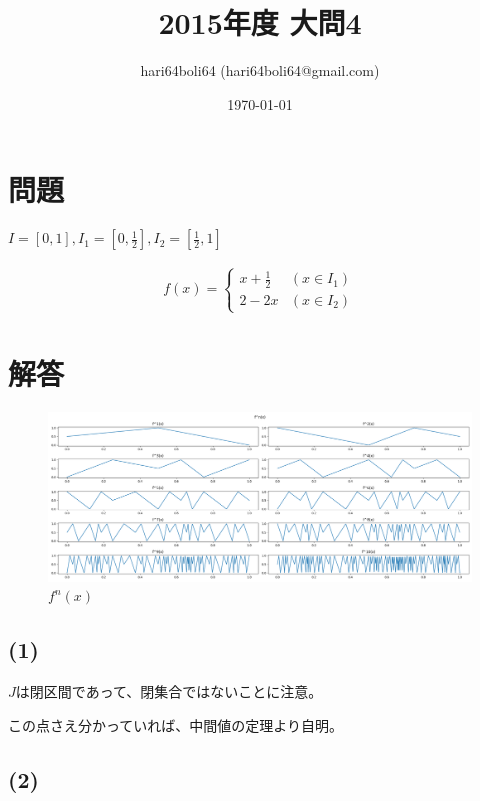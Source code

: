 \documentclass[a4paper, 10pt, dvipdfmx]{jlreq}
\begin{document}
\title{2015年度 大問4}
\author{hari64boli64 (hari64boli64@gmail.com)}
\date{\today}
\maketitle

\section{問題}

$I=[0,1],I_1=[0,\frac{1}{2}],I_2=[\frac{1}{2},1]$

\begin{align*}
  f(x)=\begin{cases}
         x+\frac{1}{2} & (x\in I_1)  \\
         2-2x          & (x \in I_2)
       \end{cases}
\end{align*}

\section{解答}

\begin{figure}[htbp]
  \begin{center}
    \includegraphics[width=140mm]{4.png}
    \caption{$f^n(x)$}
    \label{img:fnx}
  \end{center}
\end{figure}

\subsection*{(1)}

$J$は閉区間であって、閉集合ではないことに注意。

この点さえ分かっていれば、中間値の定理より自明。

\subsection*{(2)}
\end{document}
